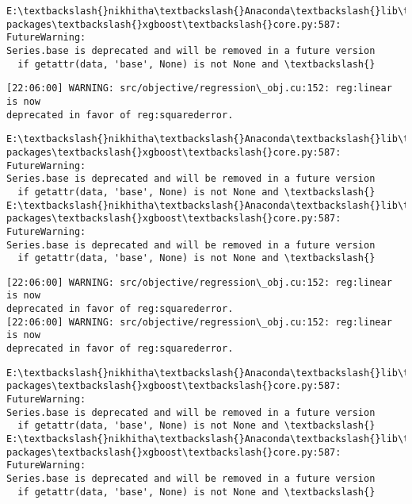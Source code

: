 \documentclass[11pt]{article}
\begin{document}
    \begin{Verbatim}[commandchars=\\\{\}]
E:\textbackslash{}nikhitha\textbackslash{}Anaconda\textbackslash{}lib\textbackslash{}site-packages\textbackslash{}xgboost\textbackslash{}core.py:587: FutureWarning:
Series.base is deprecated and will be removed in a future version
  if getattr(data, 'base', None) is not None and \textbackslash{}
    \end{Verbatim}

    \begin{Verbatim}[commandchars=\\\{\}]
[22:06:00] WARNING: src/objective/regression\_obj.cu:152: reg:linear is now
deprecated in favor of reg:squarederror.
    \end{Verbatim}

    \begin{Verbatim}[commandchars=\\\{\}]
E:\textbackslash{}nikhitha\textbackslash{}Anaconda\textbackslash{}lib\textbackslash{}site-packages\textbackslash{}xgboost\textbackslash{}core.py:587: FutureWarning:
Series.base is deprecated and will be removed in a future version
  if getattr(data, 'base', None) is not None and \textbackslash{}
E:\textbackslash{}nikhitha\textbackslash{}Anaconda\textbackslash{}lib\textbackslash{}site-packages\textbackslash{}xgboost\textbackslash{}core.py:587: FutureWarning:
Series.base is deprecated and will be removed in a future version
  if getattr(data, 'base', None) is not None and \textbackslash{}
    \end{Verbatim}

    \begin{Verbatim}[commandchars=\\\{\}]
[22:06:00] WARNING: src/objective/regression\_obj.cu:152: reg:linear is now
deprecated in favor of reg:squarederror.
[22:06:00] WARNING: src/objective/regression\_obj.cu:152: reg:linear is now
deprecated in favor of reg:squarederror.
    \end{Verbatim}

    \begin{Verbatim}[commandchars=\\\{\}]
E:\textbackslash{}nikhitha\textbackslash{}Anaconda\textbackslash{}lib\textbackslash{}site-packages\textbackslash{}xgboost\textbackslash{}core.py:587: FutureWarning:
Series.base is deprecated and will be removed in a future version
  if getattr(data, 'base', None) is not None and \textbackslash{}
E:\textbackslash{}nikhitha\textbackslash{}Anaconda\textbackslash{}lib\textbackslash{}site-packages\textbackslash{}xgboost\textbackslash{}core.py:587: FutureWarning:
Series.base is deprecated and will be removed in a future version
  if getattr(data, 'base', None) is not None and \textbackslash{}
    \end{Verbatim}
\end{document}

